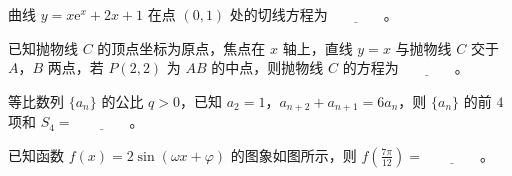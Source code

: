 \begin{question}
曲线 $y=x\mathrm e^x+2x+1$ 在点 $(0,1)$ 处的切线方程为$\underline{\qquad\qquad}$。

\end{question}
\begin{question}
已知抛物线 $C$ 的顶点坐标为原点，焦点在 $x$ 轴上，直线 $y=x$ 与抛物线 $C$ 交于 $A$，$B$ 两点，若 $P(2,2)$ 为 $AB$ 的中点，则抛物线 $C$ 的方程为$\underline{\qquad\qquad}$。

\end{question}
\begin{question}
等比数列 $\{a_n\}$ 的公比 $q>0$，已知 $a_2=1$，$a_{n+2}+a_{n+1}=6a_n$，则 $\{a_n\}$ 的前 $4$ 项和 $S_4=$$\underline{\qquad\qquad}$。

\Needspace{0.4\textheight}
\end{question}
\begin{question}
已知函数 $f(x)=2\sin(\omega x+\varphi)$ 的图象如图所示，则 $f\left(\frac{7\pi}{12}\right)=$$\underline{\qquad\qquad}$。
\nopagebreak[4]
\begin{center}\end{center}
\nopagebreak[4]
\end{question}


